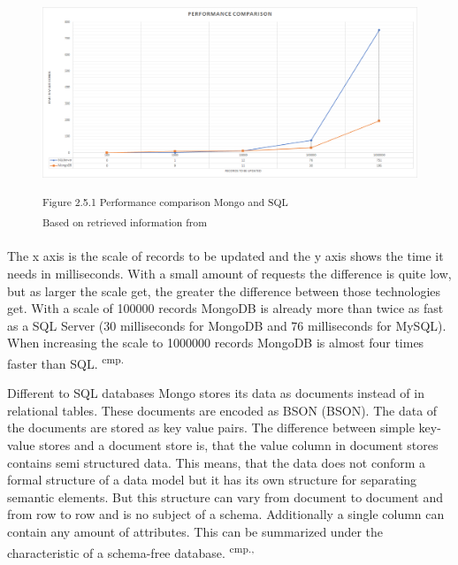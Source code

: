 \begin{figure}[h]
\centering
\includegraphics[width=\textwidth]{images/mongo_sql_comparison.png}

\textsuperscript{Figure 2.5.1 Performance comparison Mongo and SQL}\\
\textsuperscript{Based on retrieved information from \cite{34}}
\end{figure}


The x axis is the scale of records to be updated and the y axis shows the time it needs in milliseconds. With a small amount of requests the difference is quite low, but as larger the scale get, the greater the difference between those technologies get. With a scale of 100000 records MongoDB is already more than twice as fast as a SQL Server (30 milliseconds for MongoDB and 76 milliseconds for MySQL). When increasing the scale to 1000000 records MongoDB is almost four times faster than SQL.  \textsuperscript{cmp.\cite{34}}

Different to SQL databases Mongo stores its data as documents instead of in relational tables. These documents are encoded as \acs{BSON} (\acl{BSON}). The data of the documents are stored as key value pairs. The difference between simple key-value stores and a document store is, that the value column in document stores contains semi structured data. This means, that the data does not conform a formal structure of a data model but it has its own structure for separating semantic elements. But this structure can vary from document to document and from row to row and is no subject of a schema. Additionally a single column can contain any amount of attributes. This can be summarized under the characteristic of a schema-free database. \textsuperscript{cmp.\cite{35}, \cite{36}}

